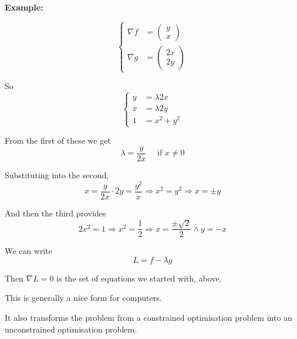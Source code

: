 \textbf{Example:}

\begin{equation}
  \begin{cases}
    \nabla f & = 
    \begin{pmatrix}
      y \\ x
    \end{pmatrix}
    \\[8mm]
    \nabla g & =
    \begin{pmatrix}
      2x \\ 2y
    \end{pmatrix}
  \end{cases}
\end{equation}

So
\begin{equation}
  \begin{cases}
    y & = \lambda 2x
    \\
    x & = \lambda 2y
    \\
    1 & = x^2 + y^2
  \end{cases}
\end{equation}

From the first of these we get
\begin{displaymath}
  \lambda = \frac{y}{2x} \quad \mbox{ if } x \neq 0
\end{displaymath}

Substituting into the second,
\begin{displaymath}
  x = \frac{y}{2x} \cdot 2y = \frac{y^2}{x} \Rightarrow x^2 = y^2
  \Rightarrow x = \pm y
\end{displaymath}

And then the third provides
\begin{displaymath}
  2x^2 = 1 \Rightarrow x^2 = \frac 12 \Rightarrow \boxed{x =
  \frac{\pm\sqrt{2}}{2} \wedge y = -x}
\end{displaymath}





We can write
\begin{displaymath}
  L = f - \lambda g
\end{displaymath}

Then $\nabla L = 0$ is the set of equations we started with, above.

This is generally a nice form for computers.

It also transforms the problem from a constrained optimisation
problem into an unconstrained optimisation problem.



